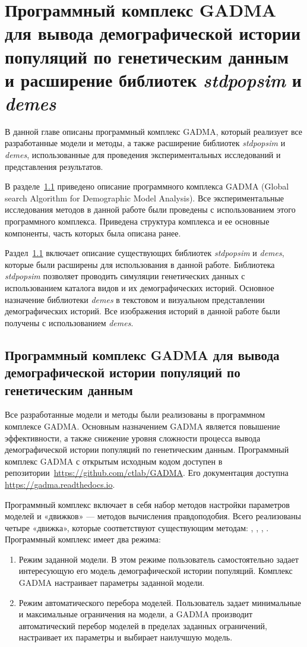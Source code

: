 \chapter{Программный комплекс GADMA для вывода демографической истории популяций по генетическим данным и расширение библиотек \textit{stdpopsim} и \textit{demes}}
\label{ch:implementation}

В данной главе описаны программный комплекс GADMA, который реализует все разработанные модели и методы, а также расширение библиотек \textit{stdpopsim} и \textit{demes}, использованные для проведения экспериментальных исследований и представления результатов.

В разделе~\ref{sec:part5:gadma} приведено описание программного комплекса GADMA (Global search Algorithm for Demographic Model Analysis).
Все экспериментальные исследования методов в данной работе были проведены с использованием этого программного комплекса.
Приведена структура комплекса и ее основные компоненты, часть которых была описана ранее.

Раздел~\ref{sec:part5:gadma} включает описание существующих библиотек \textit{stdpopsim} и \textit{demes}, которые были расширены для использования в данной работе.
Библиотека \textit{stdpopsim} позволяет проводить симуляции генетических данных с использованием каталога видов и их демографических историй.
Основное назначение библиотеки \textit{demes} в текстовом и визуальном представлении демографических историй.
Все изображения историй в данной работе были получены с использованием \textit{demes}.

\section{Программный комплекс GADMA для вывода демографической истории популяций по генетическим данным}
\label{sec:part5:gadma}

Все разработанные модели и методы были реализованы в программном комплексе GADMA.
Основным назначением GADMA является повышение эффективности, а также снижение уровня сложности процесса вывода демографической истории популяций по генетическим данным.
Программный комплекс GADMA с открытым исходным кодом доступен в репозитории~\url{https://github.com/ctlab/GADMA}.
Его документация доступна \url{https://gadma.readthedocs.io}.

Программный комплекс включает в себя набор методов настройки параметров моделей и «движков» --- методов вычисления правдоподобия.
Всего реализованы четыре «движка», которые соответствуют существующим методам: \dadi, \moments, \momi, \momentsLD.
Программный комплекс имеет два режима:
\begin{enumerate}
    \item Режим заданной модели. В этом режиме пользователь самостоятельно задает интересующую его модель демографической истории популяций. Комплекс GADMA настраивает параметры заданной модели.
    \item Режим автоматического перебора моделей. Пользователь задает минимальные и максимальные ограничения на модели, а GADMA производит автоматический перебор моделей в пределах заданных ограничений, настраивает их параметры и выбирает наилучшую модель. 
\end{enumerate}

